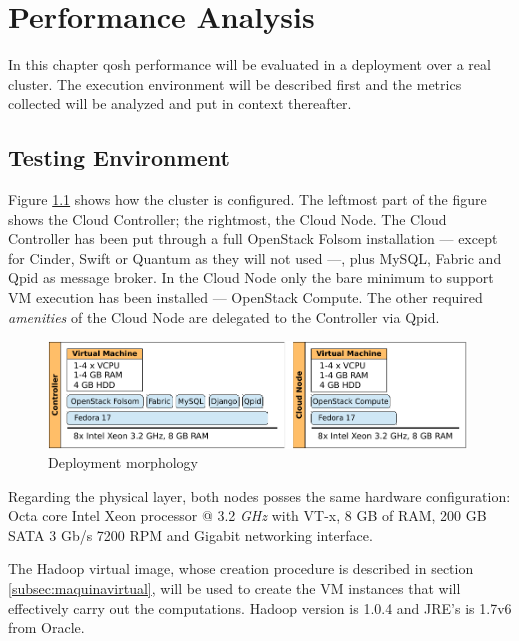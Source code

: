 \chapter{Performance Analysis}\label{cap:rendimiento}
\noindent In this chapter qosh performance will be evaluated in a deployment over a real cluster. The execution environment will be described first and the metrics collected will be analyzed and put in context thereafter.

\section{Testing Environment}\label{sec:entornodeprueba}
\noindent Figure \ref{fig:clusterdespliegue} shows how the cluster is configured. The leftmost part of the figure shows the Cloud Controller; the rightmost, the Cloud Node. The Cloud Controller has been put through a full OpenStack Folsom installation --- except for Cinder, Swift or Quantum as they will not used ---, plus MySQL, Fabric and Qpid as message broker. In the Cloud Node only the bare minimum to support VM execution has been installed --- OpenStack Compute. The other required \emph{amenities} of the Cloud Node are delegated to the Controller via Qpid.

\begin{figure}[tbp]
\begin{center}
\includegraphics[width=0.99\textwidth]{imagenes/038.pdf}
 \caption{Deployment morphology}
\label{fig:clusterdespliegue}
\end{center}
\end{figure}

Regarding the physical layer, both nodes posses the same hardware configuration: Octa core Intel Xeon processor @ 3.2 \emph{GHz} with VT-x, 8 GB of RAM, 200 GB SATA 3 Gb/s 7200 RPM and Gigabit networking interface.

The Hadoop virtual image, whose creation procedure is described in section \ref{subsec:maquinavirtual}, will be used to create the VM instances that will effectively carry out the computations. Hadoop version is 1.0.4 and JRE's is 1.7v6 from Oracle.

